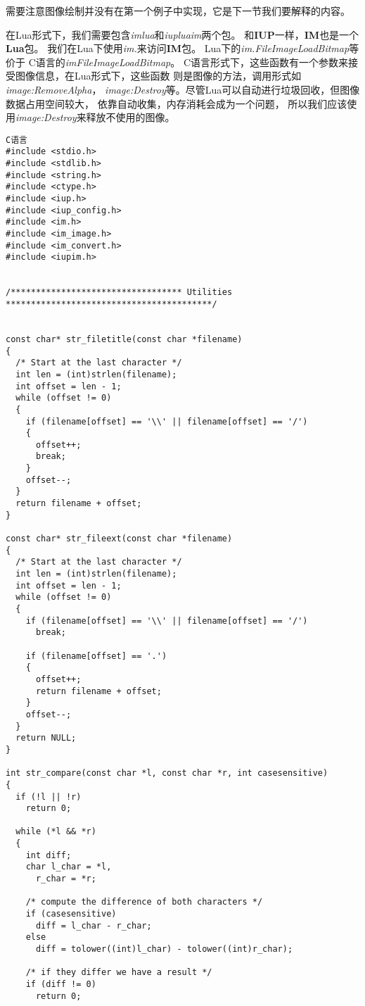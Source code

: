 \documentclass{ctexart}
\begin{document}
需要注意图像绘制并没有在第一个例子中实现，它是下一节我们要解释的内容。

在Lua形式下，我们需要包含\emph{imlua}和\emph{iupluaim}两个包。
和\textbf{IUP}一样，\textbf{IM}也是一个\textbf{Lua}包。
我们在Lua下使用\emph{im.}来访问\textbf{IM}包。
Lua下的\emph{im.FileImageLoadBitmap}等价于
C语言的\emph{imFileImageLoadBitmap}。
C语言形式下，这些函数有一个参数来接受图像信息，在Lua形式下，这些函数
则是图像的方法，调用形式如\emph{image:RemoveAlpha}，
\emph{image:Destroy}等。尽管Lua可以自动进行垃圾回收，但图像数据占用空间较大，
依靠自动收集，内存消耗会成为一个问题，
所以我们应该使用\emph{image:Destroy}来释放不使用的图像。


\lstset{language=C}
\begin{lstlisting}
C语言
#include <stdio.h>
#include <stdlib.h>
#include <string.h>
#include <ctype.h>
#include <iup.h>
#include <iup_config.h>
#include <im.h>
#include <im_image.h>
#include <im_convert.h>
#include <iupim.h>


/********************************** Utilities *****************************************/


const char* str_filetitle(const char *filename)
{
  /* Start at the last character */
  int len = (int)strlen(filename);
  int offset = len - 1;
  while (offset != 0)
  {
    if (filename[offset] == '\\' || filename[offset] == '/')
    {
      offset++;
      break;
    }
    offset--;
  }
  return filename + offset;
}

const char* str_fileext(const char *filename)
{
  /* Start at the last character */
  int len = (int)strlen(filename);
  int offset = len - 1;
  while (offset != 0)
  {
    if (filename[offset] == '\\' || filename[offset] == '/')
      break;

    if (filename[offset] == '.')
    {
      offset++;
      return filename + offset;
    }
    offset--;
  }
  return NULL;
}

int str_compare(const char *l, const char *r, int casesensitive)
{
  if (!l || !r)
    return 0;

  while (*l && *r)
  {
    int diff;
    char l_char = *l,
      r_char = *r;

    /* compute the difference of both characters */
    if (casesensitive)
      diff = l_char - r_char;
    else
      diff = tolower((int)l_char) - tolower((int)r_char);

    /* if they differ we have a result */
    if (diff != 0)
      return 0;


\end{lstlisting}
\end{document}
